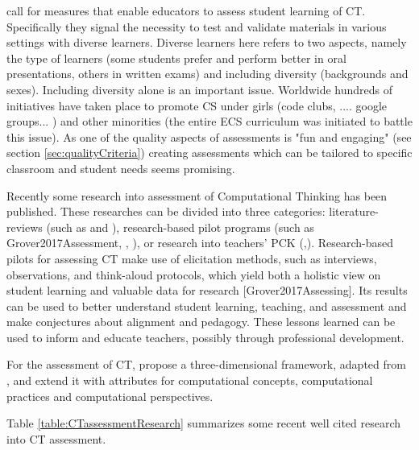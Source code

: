  call for measures that enable educators to assess student learning of CT. Specifically they signal the necessity to test and validate materials in various settings with diverse learners. Diverse learners here refers to two aspects, namely the type of learners (some students prefer and perform better in oral presentations, others in written exams) and including diversity (backgrounds and sexes). Including diversity alone is an important issue. Worldwide hundreds of initiatives have taken place to promote CS under girls (code clubs, .... google groups... ) and other minorities (the entire ECS curriculum was initiated to battle this issue). As one of the quality aspects of assessments is "fun and engaging" (see section \ref{sec:qualityCriteria}) creating assessments which can be tailored to specific classroom and student needs seems promising.

Recently some research into assessment of Computational Thinking has been published. These researches can be divided into three categories: literature-reviews (such as \cite{GroverPea2013} and \cite{crick2017}), research-based pilot programs (such as Grover2017Assessment, \cite{snow2017CTECD}, \cite{atmatzidou2016CTrobots}), or research into teachers' PCK (\cite{Yadav2017CTteacherEd},\cite{Yadav2016}). Research-based pilots for assessing CT make use of elicitation methods, such as interviews, observations, and think-aloud protocols, which yield both a holistic view on student learning and valuable data for research [Grover2017Assessing]. Its results can be used to better understand student learning, teaching, and assessment and make conjectures about alignment and pedagogy. These lessons learned can be used to inform and educate teachers, possibly through professional development.


For the assessment of CT,  propose a three-dimensional framework, adapted from , and extend it with attributes for computational concepts, computational practices and computational perspectives.

Table \ref{table:CTassessmentResearch} summarizes some recent well cited research into CT assessment.




